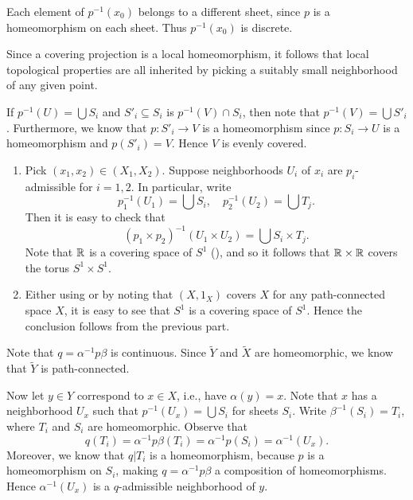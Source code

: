 \documentclass[../../solutions.tex]{subfiles}
\begin{document}
\begin{exercise} \leavevmode
Each element of $p^{-1}(x_0)$ belongs to a different sheet, since $p$ is a homeomorphism on each sheet.
Thus $p^{-1}(x_0)$ is discrete.
\end{exercise}

\begin{exercise} \leavevmode
Since a covering projection is a local homeomorphism, it follows that local topological properties are all inherited by picking a suitably small neighborhood of any given point.
\end{exercise}

\begin{exercise} \leavevmode
If $p^{-1}(U)=\bigcup S_i$ and $S'_i\subseteq S_i$ is $p^{-1}(V)\cap S_i$, then note that $p^{-1}(V)=\bigcup S'_i$.
Furthermore, we know that $p:S'_i\to V$ is a homeomorphism since $p:S_i\to U$ is a homeomorphism and $p(S'_i)=V$.
Hence $V$ is evenly covered.
\end{exercise}

\begin{exercise} \leavevmode
\begin{enumerate}
\item
Pick $(x_1,x_2)\in(X_1,X_2)$.
Suppose neighborhoods $U_i$ of $x_i$ are $p_i$-admissible for $i=1,2$.
In particular, write
\[p_1^{-1}(U_1)=\bigcup S_i,\quad p_2^{-1}(U_2)=\bigcup T_j.\]
Then it is easy to check that
\[(p_1\times p_2)^{-1}(U_1\times U_2)=\bigcup S_i\times T_j.\]
Note that $\mathbb{R}$ is a covering space of $S^1$ (), and so it follows that $\mathbb{R}\times\mathbb{R}$ covers the torus $S^1\times S^1$.

\item
Either using  or by noting that $(X,1_X)$ covers $X$ for any path-connected space $X$, it is easy to see that $S^1$ is a covering space of $S^1$.
Hence the conclusion follows from the previous part.
\end{enumerate}
\end{exercise}

\begin{exercise} \leavevmode
Note that $q=\alpha^{-1}p\beta$ is continuous.
Since $\widetilde Y$ and $\widetilde X$ are homeomorphic, we know that $\widetilde Y$ is path-connected.

Now let $y\in Y$ correspond to $x\in X$, i.e., have $\alpha(y)=x$.
Note that $x$ has a neighborhood $U_x$ such that $p^{-1}(U_x)=\bigcup S_i$ for sheets $S_i$.
Write $\beta^{-1}(S_i)=T_i$, where $T_i$ and $S_i$ are homeomorphic.
Observe that
\[q(T_i)=\alpha^{-1}p\beta(T_i)=\alpha^{-1}p(S_i)=\alpha^{-1}(U_x).\]
Moreover, we know that $q|T_i$ is a homeomorphism, because $p$ is a homeomorphism on $S_i$, making $q=\alpha^{-1}p\beta$ a composition of homeomorphisms.
Hence $\alpha^{-1}(U_x)$ is a $q$-admissible neighborhood of $y$.
\end{exercise}
\end{document}
